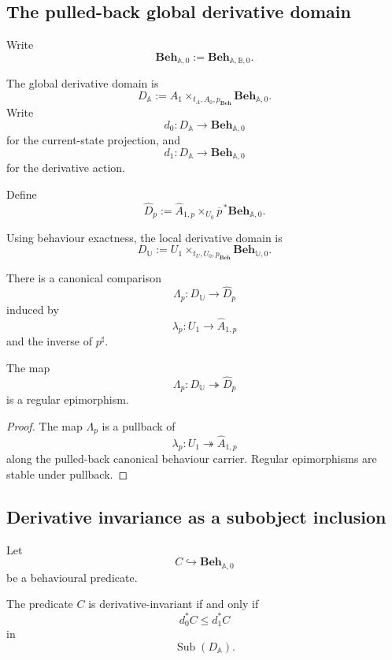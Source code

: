 \subsection{The pulled-back global derivative domain}
\label{subsec:pulled-back-global-derivative-domain}

Write
\[
    \mathbf{Beh}_{\mathbb A,0}
    :=
    \mathbf{Beh}_{\mathbb A,\mathbb B,0}.
\]

The global derivative domain is
\[
    D_{\mathbb A}
    :=
    A_1
    \times_{t_A,A_0,p_{\mathbf{Beh}}}
    \mathbf{Beh}_{\mathbb A,0}.
\]
Write
\[
    d_0:
    D_{\mathbb A}\to
    \mathbf{Beh}_{\mathbb A,0}
\]
for the current-state projection, and
\[
    d_1:
    D_{\mathbb A}\to
    \mathbf{Beh}_{\mathbb A,0}
\]
for the derivative action.

Define
\[
    \widehat D_p
    :=
    \widehat A_{1,p}
    \times_{U_0}
    \overline p^{\,\ast}
    \mathbf{Beh}_{\mathbb A,0}.
\]

Using behaviour exactness, the local derivative domain is
\[
    D_{\mathbb U}
    :=
    U_1
    \times_{t_U,U_0,p_{\mathbf{Beh}}}
    \mathbf{Beh}_{\mathbb U,0}.
\]

There is a canonical comparison
\[
    \Lambda_p:
    D_{\mathbb U}\to\widehat D_p
\]
induced by
\[
    \lambda_p:
    U_1\to\widehat A_{1,p}
\]
and the inverse of \(p^\sharp\).

\begin{lemma}
\label{lem:derivative-domain-covering}
The map
\[
    \Lambda_p:
    D_{\mathbb U}\twoheadrightarrow\widehat D_p
\]
is a regular epimorphism.
\end{lemma}

\begin{proof}
The map \(\Lambda_p\) is a pullback of
\[
    \lambda_p:
    U_1\twoheadrightarrow\widehat A_{1,p}
\]
along the pulled-back canonical behaviour carrier. Regular epimorphisms are
stable under pullback.
\end{proof}

\subsection{Derivative invariance as a subobject inclusion}
\label{subsec:derivative-invariance-subobject-inclusion}

Let
\[
    C\hookrightarrow\mathbf{Beh}_{\mathbb A,0}
\]
be a behavioural predicate.

\begin{proposition}
\label{prop:subobject-form-derivative-invariance}
The predicate \(C\) is derivative-invariant if and only if
\[
    d_0^\ast C
    \leq
    d_1^\ast C
\]
in
\[
    \operatorname{Sub}(D_{\mathbb A}).
\]
\end{proposition}

